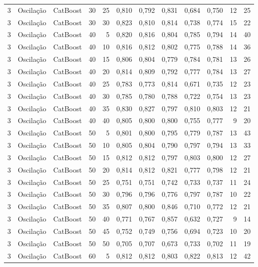 \begin{longtable}{@{}rllrrrrrrrrr@{}}
3 & Oscilação & CatBoost & 30 & 25 & 0,810 & 0,792 & 0,831 & 0,684 & 0,750 & 12 & 25 \\
3 & Oscilação & CatBoost & 30 & 30 & 0,823 & 0,810 & 0,814 & 0,738 & 0,774 & 15 & 22 \\
3 & Oscilação & CatBoost & 40 & 5 & 0,820 & 0,816 & 0,804 & 0,785 & 0,794 & 14 & 40 \\
3 & Oscilação & CatBoost & 40 & 10 & 0,816 & 0,812 & 0,802 & 0,775 & 0,788 & 14 & 36 \\
3 & Oscilação & CatBoost & 40 & 15 & 0,806 & 0,804 & 0,779 & 0,784 & 0,781 & 13 & 26 \\
3 & Oscilação & CatBoost & 40 & 20 & 0,814 & 0,809 & 0,792 & 0,777 & 0,784 & 13 & 27 \\
3 & Oscilação & CatBoost & 40 & 25 & 0,783 & 0,773 & 0,814 & 0,671 & 0,735 & 12 & 23 \\
3 & Oscilação & CatBoost & 40 & 30 & 0,785 & 0,780 & 0,788 & 0,722 & 0,754 & 13 & 23 \\
3 & Oscilação & CatBoost & 40 & 35 & 0,830 & 0,827 & 0,797 & 0,810 & 0,803 & 12 & 21 \\
3 & Oscilação & CatBoost & 40 & 40 & 0,805 & 0,800 & 0,800 & 0,755 & 0,777 & 9 & 20 \\
3 & Oscilação & CatBoost & 50 & 5 & 0,801 & 0,800 & 0,795 & 0,779 & 0,787 & 13 & 43 \\
3 & Oscilação & CatBoost & 50 & 10 & 0,805 & 0,804 & 0,790 & 0,797 & 0,794 & 13 & 33 \\
3 & Oscilação & CatBoost & 50 & 15 & 0,812 & 0,812 & 0,797 & 0,803 & 0,800 & 12 & 27 \\
3 & Oscilação & CatBoost & 50 & 20 & 0,814 & 0,812 & 0,821 & 0,777 & 0,798 & 12 & 21 \\
3 & Oscilação & CatBoost & 50 & 25 & 0,751 & 0,751 & 0,742 & 0,733 & 0,737 & 11 & 24 \\
3 & Oscilação & CatBoost & 50 & 30 & 0,796 & 0,796 & 0,776 & 0,797 & 0,787 & 10 & 22 \\
3 & Oscilação & CatBoost & 50 & 35 & 0,807 & 0,800 & 0,846 & 0,710 & 0,772 & 12 & 21 \\
3 & Oscilação & CatBoost & 50 & 40 & 0,771 & 0,767 & 0,857 & 0,632 & 0,727 & 9 & 14 \\
3 & Oscilação & CatBoost & 50 & 45 & 0,752 & 0,749 & 0,756 & 0,694 & 0,723 & 10 & 20 \\
3 & Oscilação & CatBoost & 50 & 50 & 0,705 & 0,707 & 0,673 & 0,733 & 0,702 & 11 & 19 \\
3 & Oscilação & CatBoost & 60 & 5 & 0,812 & 0,812 & 0,803 & 0,822 & 0,813 & 12 & 42 \\

\end{longtable}
